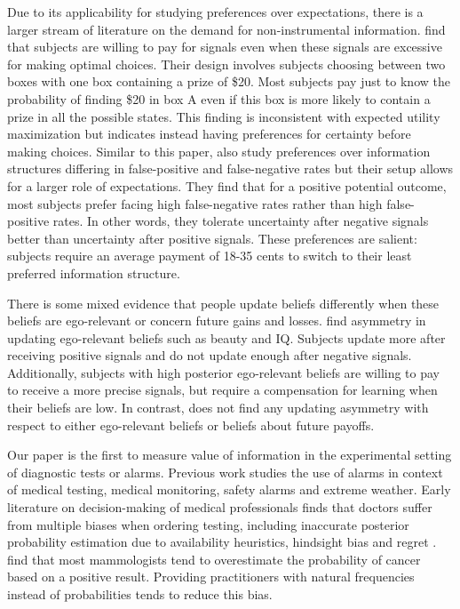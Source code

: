 \documentclass[12pt,a4paper]{article}
\begin{document}
Due to its applicability for studying preferences over expectations, there is a larger stream of literature on the demand for non-instrumental information. \citet{eliaz_paying_2010} find that subjects are willing to pay for signals even when these signals are excessive for making optimal choices. Their design involves subjects choosing between two boxes with one box containing a prize of \$20. Most subjects pay just to know the probability of finding \$20 in box A even if this box is more likely to contain a prize in all the possible states. This finding is inconsistent with expected utility maximization but indicates instead having preferences for certainty before making choices.  Similar to this paper, \citet{masatlioglu_intrinsic_2017} also study preferences over information structures differing in false-positive and false-negative rates but their setup allows for a larger role of expectations. They find that for a positive potential outcome, most subjects prefer facing high false-negative rates rather than high false-positive rates. In other words, they tolerate uncertainty after negative signals better than uncertainty after positive signals. These preferences are salient: subjects require an average payment of 18-35 cents to switch to their least preferred information structure.

There is some mixed evidence that people update beliefs differently when these beliefs are ego-relevant or concern future gains and losses. \citet{eil_good_2011} find asymmetry in updating ego-relevant beliefs such as beauty and IQ. Subjects update more after receiving positive signals and do not update enough after negative signals. Additionally, subjects with high posterior ego-relevant beliefs are willing to pay to receive a more precise signals, but require a compensation for learning when their beliefs are low. In contrast, \citet{coutts_good_2019} does not find any updating asymmetry with respect to either ego-relevant beliefs or beliefs about future payoffs. 

Our paper is the first to measure value of information in the experimental setting of diagnostic tests or alarms. Previous work studies the use of alarms in context of medical testing, medical monitoring, safety alarms and extreme weather. Early literature on decision-making of medical professionals finds that doctors suffer from multiple biases when ordering testing, including  inaccurate posterior probability estimation due to availability heuristics, hindsight bias and regret \citep{bornstein_rationality_2001}. \citet{gigerenzer_helping_2007} find that most mammologists tend to overestimate the probability of cancer based on a positive result. Providing practitioners with natural frequencies instead of probabilities tends to reduce this bias.  
\end{document}
